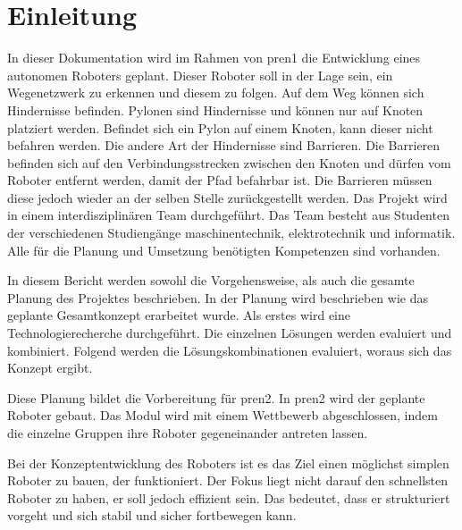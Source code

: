 \section{Einleitung}

In dieser Dokumentation wird im Rahmen von \acrfull{pren1} die Entwicklung eines autonomen Roboters geplant. Dieser Roboter soll in der Lage sein, ein Wegenetzwerk zu erkennen und diesem zu folgen. Auf dem Weg können sich Hindernisse befinden. Pylonen sind Hindernisse und können nur auf Knoten platziert werden. Befindet sich ein Pylon auf einem Knoten, kann dieser nicht befahren werden. Die andere Art der Hindernisse sind Barrieren. Die Barrieren befinden sich auf den Verbindungsstrecken zwischen den Knoten und dürfen vom Roboter entfernt werden, damit der Pfad befahrbar ist. Die Barrieren müssen diese jedoch wieder an der selben Stelle zurückgestellt werden.
Das Projekt wird in einem interdisziplinären Team durchgeführt. Das Team besteht aus Studenten der verschiedenen Studiengänge \acrfull{maschinentechnik}, \acrfull{elektrotechnik} und \acrfull{informatik}. Alle für die Planung und Umsetzung benötigten Kompetenzen sind vorhanden.

In diesem Bericht werden sowohl die Vorgehensweise, als auch die gesamte Planung des Projektes beschrieben. In der Planung wird beschrieben wie das geplante Gesamtkonzept erarbeitet wurde. Als erstes wird eine Technologierecherche durchgeführt. Die einzelnen Lösungen werden evaluiert und kombiniert. Folgend werden die Lösungskombinationen evaluiert, woraus sich das Konzept ergibt.

Diese Planung bildet die Vorbereitung für \acrfull{pren2}. In \acrshort{pren2} wird der geplante Roboter gebaut. Das Modul wird mit einem Wettbewerb abgeschlossen, indem die einzelne Gruppen ihre Roboter gegeneinander antreten lassen.

Bei der Konzeptentwicklung des Roboters ist es das Ziel einen möglichst simplen Roboter zu bauen, der funktioniert. Der Fokus liegt nicht darauf den schnellsten Roboter zu haben, er soll jedoch effizient sein. Das bedeutet, dass er strukturiert vorgeht und sich stabil und sicher fortbewegen kann.
